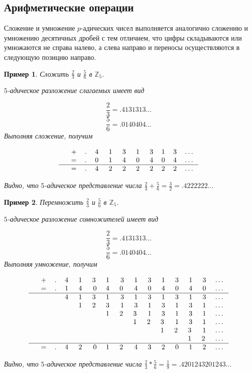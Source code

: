 \documentclass[master, och, diploma, times]{sty/SCWorks}
\theoremstyle{plain}
\newtheorem{exmp}{Пример}[section]
\theoremstyle{definition}
\begin{document}
\subsection{Арифметические операции}

Сложение и умножение $p$-адических чисел выполняется аналогично сложению и умножению десятичных дробей с тем отличием, что цифры складываются или умножаются не справа налево, а слева направо и переносы осуществляются в следующую позицию направо.

\begin{exmp}
Сложить $\frac{2}{3}$ и $\frac{5}{6}$ в $\mathbb{Z}_5$.

\noindent $5$-адическое разложение слагаемых имеет вид

$$
\frac{2}{3}=.4131313\dots
$$
$$
\frac{5}{6}=.0140404\dots
$$
Выполняя сложение, получим

$$
\begin{tabular}{cccccccccccc}
& + & . & 4\; & 1\; & 3\; & 1\; & 3 & 1 & 3 & \dots \\
& = & . & 0\; & 1\; & 4\; & 0\; & 4 & 0 & 4 & \dots \\
\hline
& = & . & 4\; & 2\; & 2\; & 2\; & 2 & 2 & 2 & \dots
\end{tabular}
$$

\noindent Видно, что $5$-адическое представление числа $\frac{2}{3} + \frac{5}{6}=\frac{3}{2}=.4222222\dots$
\end{exmp}

\begin{exmp}
Перемножить $\frac{2}{3}$ и $\frac{5}{6}$ в $\mathbb{Z}_5$.

\noindent $5$-адическое разложение сомножителей имеет вид

$$
\frac{2}{3}=.4131313\dots
$$
$$
\frac{5}{6}=.0140404\dots
$$
Выполняя умножение, получим

$$
\begin{tabular}{ccccccccccccccccc}
& + & . & 4\; & 1\; & 3\; & 1\; & 3 & 1 & 3 & 1 & 3 & 1 & 3 & \dots \\
& = & . & 1\; & 4\; & 0 & 4\; & 0\; & 4 & 0 & 4 & 0 & 4 & 0 & \dots \\
\hline
& & & 4\; & 1\; & 3\; & 1\; & 3 & 1 & 3 & 1 & 3 & 1 & 3 & \dots \\
& & & & 1\; & 2\; & 3\; & 1 & 3 & 1 & 3 & 1 & 3 & 1 & \dots \\
& & & & & & 1\; & 2\; & 3\; & 1 & 3 & 1 & 3 & 1 & \dots \\
& & & & & & & & 1\; & 2\; & 3\; & 1 & 3 & 1 & \dots \\
& & & & & & & & & & 1\; & 2\; & 3\; & 1 &  \dots \\
& & & & & & & & & & & & 1\; & 2\; & \dots \\
\hline
& = & . & 4\; & 2\; & 0 & 1\; & 2\; & 4 & 3 & 2 & 0 & 1 & 2 & \dots \\
\end{tabular}
$$

\noindent Видно, что $5$-адическое представление числа $\frac{2}{3} * \frac{5}{6}=\frac{1}{9}=.4201243201243\dots$
\end{exmp}
\end{document}
